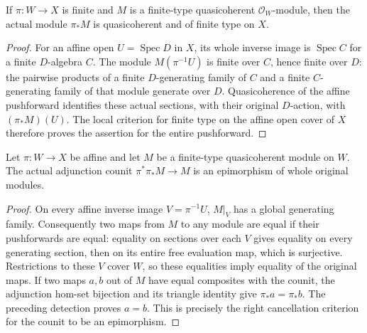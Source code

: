 \begin{lemma}
\label{lem:kn-nadel-finite-pushforward-coherent}
\leanok
If $\pi:W\to X$ is finite and $M$ is a finite-type quasicoherent
$\mathcal O_W$-module, then the actual module $\pi_*M$ is quasicoherent
and of finite type on $X$.
\end{lemma}
\begin{proof}
For an affine open $U=\operatorname{Spec}D$ in $X$, its whole inverse
image is $\operatorname{Spec}C$ for a finite $D$-algebra $C$.
The module $M(\pi^{-1}U)$ is finite over $C$, hence finite over $D$:
the pairwise products of a finite $D$-generating family of $C$ and a
finite $C$-generating family of that module generate over $D$.
Quasicoherence of the affine pushforward identifies these actual
sections, with their original $D$-action, with $(\pi_*M)(U)$.
The local criterion for finite type on the affine open cover of $X$
therefore proves the assertion for the entire pushforward.
\end{proof}

\begin{lemma}
\label{lem:kn-nadel-affine-counit-epi}
\leanok
Let $\pi:W\to X$ be affine and let $M$ be a finite-type quasicoherent
module on $W$.  The actual adjunction counit
$\pi^*\pi_*M\to M$ is an epimorphism of whole original modules.
\end{lemma}
\begin{proof}
On every affine inverse image $V=\pi^{-1}U$, $M|_V$ has a global
generating family.  Consequently two maps from $M$ to any module are
equal if their pushforwards are equal: equality on sections over each
$V$ gives equality on every generating section, then on its entire
free evaluation map, which is surjective.  Restrictions to these $V$
cover $W$, so these equalities imply equality of the original maps.
If two maps $a,b$ out of $M$ have equal composites with the counit,
the adjunction hom-set bijection and its triangle identity give
$\pi_*a=\pi_*b$.  The preceding detection proves $a=b$.
This is precisely the right cancellation criterion for the counit
to be an epimorphism.
\end{proof}

